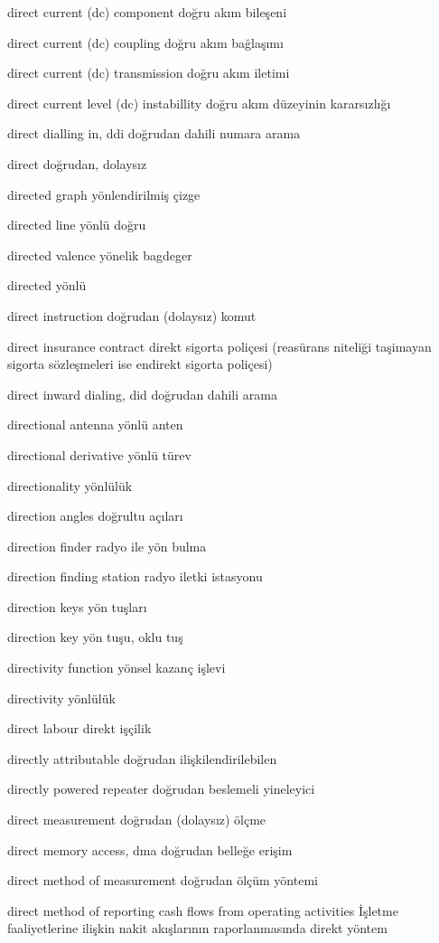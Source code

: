 \documentclass[12pt,fleqn]{article}\usepackage{../../common}
\begin{document}
direct current (dc) component doğru akım bileşeni

direct current (dc) coupling doğru akım bağlaşımı

direct current (dc) transmission doğru akım iletimi

direct current level (dc) instabillity doğru akım düzeyinin kararsızlığı

direct dialling in, ddi doğrudan dahili numara arama

direct doğrudan, dolaysız

directed graph yönlendirilmiş çizge

directed line yönlü doğru

directed valence yönelik bagdeger

directed yönlü

direct instruction doğrudan (dolaysız) komut

direct insurance contract direkt sigorta poliçesi (reasürans niteliği taşimayan sigorta sözleşmeleri ise endirekt sigorta poliçesi)

direct inward dialing, did doğrudan dahili arama

directional antenna yönlü anten

directional derivative yönlü türev

directionality yönlülük

direction angles doğrultu açıları

direction finder radyo ile yön bulma

direction finding station radyo iletki istasyonu

direction keys yön tuşları

direction key yön tuşu, oklu tuş

directivity function yönsel kazanç işlevi

directivity yönlülük

direct labour direkt işçilik

directly attributable doğrudan ilişkilendirilebilen

directly powered repeater doğrudan beslemeli yineleyici

direct measurement doğrudan (dolaysız) ölçme

direct memory access, dma doğrudan belleğe erişim

direct method of measurement doğrudan ölçüm yöntemi

direct method of reporting cash flows from operating activities İşletme faaliyetlerine ilişkin nakit akışlarının raporlanmasında direkt yöntem
\end{document}
